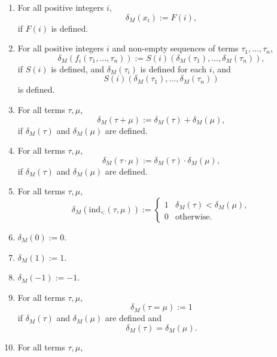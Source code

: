 \documentclass[11pt]{article}
\begin{document}
\begin{enumerate}
	\item For all positive integers $i$,
		\begin{equation}
			\delta_M(x_i) := F(i),
		\end{equation}
		if $F(i)$ is defined.
	\item For all positive integers $i$ and non-empty sequences of terms $\tau_1, ..., \tau_n$,
		\begin{equation}
			\delta_M(f_i(\tau_1, ..., \tau_n)) := S(i)(\delta_M(\tau_1), ..., \delta_M(\tau_n)),
		\end{equation}
		if $S(i)$ is defined, and $\delta_M(\tau_i)$ is defined for each $i$, and 
		\begin{equation}
			S(i)(\delta_M(\tau_1), ..., \delta_M(\tau_n))
		\end{equation}
		is defined.
	\item For all terms $\tau, \mu$,
		\begin{equation}
			\delta_M(\tau + \mu) := \delta_M(\tau) + \delta_M(\mu),
		\end{equation}
		if $\delta_M(\tau)$ and $\delta_M(\mu)$ are defined.
	\item For all terms $\tau, \mu$,
		\begin{equation}
			\delta_M(\tau \cdot \mu) := \delta_M(\tau) \cdot \delta_M(\mu),
		\end{equation}
		if $\delta_M(\tau)$ and $\delta_M(\mu)$ are defined.
	\item For all terms $\tau, \mu$,
		\begin{equation}
			\delta_M(\text{ind}_<(\tau, \mu)) := \begin{cases}
				1 & \delta_M(\tau) < \delta_M(\mu), \\
				0 & \text{otherwise}.
			\end{cases}
		\end{equation}
	\item $\delta_M(0) := 0$.
	\item $\delta_M(1) := 1$.
	\item $\delta_M(-1) := -1$.
	\item For all terms $\tau, \mu$,
		\begin{equation}
			\delta_M(\tau = \mu) := 1
		\end{equation}
		if $\delta_M(\tau)$ and $\delta_M(\mu)$ are defined and
		\begin{equation}
			\delta_M(\tau) = \delta_M(\mu).
		\end{equation}
	\item For all terms $\tau, \mu$,

\end{enumerate}
\end{document}
